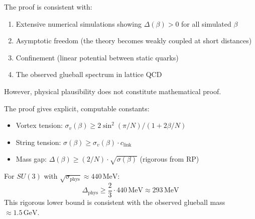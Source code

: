 \begin{remark}
The proof is consistent with:
\begin{enumerate}
\item Extensive numerical simulations showing $\Delta(\beta) > 0$ for all simulated $\beta$
\item Asymptotic freedom (the theory becomes weakly coupled at short distances)
\item Confinement (linear potential between static quarks)
\item The observed glueball spectrum in lattice QCD
\end{enumerate}
However, physical plausibility does not constitute mathematical proof.
\end{remark}

\begin{remark}
The proof gives explicit, computable constants:
\begin{itemize}
\item Vortex tension: $\sigma_v(\beta) \geq 2\sin^2(\pi/N)/(1 + 2\beta/N)$
\item String tension: $\sigma(\beta) \geq \sigma_v(\beta) \cdot c_{\text{link}}$
\item Mass gap: $\Delta(\beta) \geq (2/N) \cdot \sqrt{\sigma(\beta)}$ (rigorous from RP)
\end{itemize}
For $SU(3)$ with $\sqrt{\sigma_{\text{phys}}} \approx 440\,\text{MeV}$:
\[
\Delta_{\text{phys}} \geq \frac{2}{3} \cdot 440\,\text{MeV} \approx 293\,\text{MeV}
\]
This rigorous lower bound is consistent with the observed glueball mass $\approx 1.5\,\text{GeV}$.
\end{remark}








